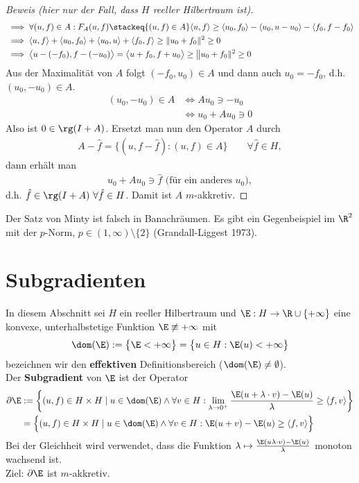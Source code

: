 \begin{proof}[Beweis (hier nur der Fall, dass $H$ reeller Hilbertraum ist)]
\begin{align*}
&\implies
\forall(u,f)\in A:
F_A(u,f)\stackeq{(u,f)\in A}\langle u,f\rangle\geq\langle u_0,f_0\rangle-\langle u_0,u-u_0\rangle-\langle f_0,f-f_0\rangle\\
&\implies
\langle u,f\rangle +\langle u_0,f_0\rangle+\langle u_0,u\rangle+\langle f_0,f\rangle\geq\Vert u_0+f_0\Vert^2\geq0\\
&\implies
\big\langle u-(-f_0),f-(-u_0)\big\rangle=
\big\langle u+f_0,f+u_0\big\rangle\geq\big\Vert u_0+f_0\Vert^2\geq0
\end{align*}
Aus der Maximalität von $A$ folgt $(-f_0,u_0)\in A$ und dann auch $u_0=-f_0$, d.h.\\ $(u_0,-u_0)\in A$.
\begin{align*}
(u_0,-u_0)\in A
&\Longleftrightarrow Au_0\ni -u_0\\
&\Longleftrightarrow u_0+Au_0\ni 0
\end{align*}
Also ist $0\in\rg(I+A)$. Ersetzt man nun den Operator $A$ durch
\begin{align*}
A-\hat{f}=\big\lbrace(u,f-\hat{f}):(u,f)\in A\big\rbrace\qquad\forall \hat{f}\in H,
\end{align*}
dann erhält man
\begin{align*}
u_0+Au_0\ni\hat{f}\text{ (für ein anderes $u_0$)},
\end{align*}
d.h. $\hat{f}\in\rg(I+A)~\forall\hat{f}\in H$. Damit ist $A$ $m$-akkretiv.
\end{proof}

\begin{bemerkung}
Der Satz von Minty ist falsch in Banachräumen. Es gibt ein Gegenbeispiel im $\R^2$ mit der $p$-Norm, $p\in(1,\infty)\setminus\lbrace2\rbrace$ (Grandall-Liggest 1973).
\end{bemerkung}

\section{Subgradienten}
In diesem Abschnitt sei $H$ ein reeller Hilbertraum und $\E:H\to\R\cup\lbrace+\infty\rbrace$ eine konvexe, unterhalbstetige Funktion $\E\not\equiv+\infty$ mit
\begin{align*}
\dom(\E):=\big\lbrace\E<+\infty\big\rbrace=\big\lbrace u\in H:\E(u)<+\infty\big\rbrace
\end{align*}
bezeichnen wir den \textbf{effektiven} Definitionsbereich ($\dom(\E)\neq\emptyset$).\\
Der \textbf{Subgradient} von $\E$ ist der Operator
\begin{align*}
\partial\E&:=\left\lbrace (u,f)\in H\times H\mid u\in\dom(\E)\wedge\forall v\in H:\lim\limits_{\lambda\to0^+}\frac{\E(u+\lambda\cdot v)-\E(u)}{\lambda}\geq\langle f,v\rangle\right\rbrace\\
&=\Big\lbrace(u,f)\in H\times H\mid u\in\dom(\E)\wedge\forall v\in H:\E(u+v)-\E(u)\geq\langle f,v\rangle\Big\rbrace
\end{align*}
Bei der Gleichheit wird verwendet, dass die Funktion $\lambda\mapsto\frac{\E(u\lambda\cdot v)-\E(u)}{\lambda}$ monoton wachsend ist.\\
Ziel: $\partial\E$ ist $m$-akkretiv.

